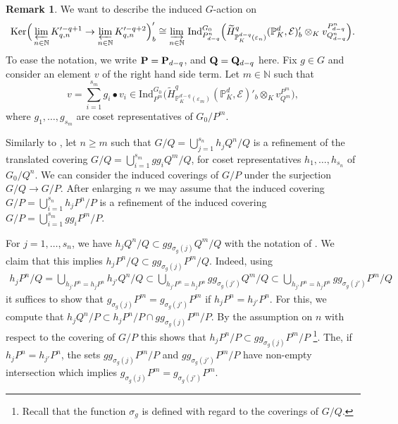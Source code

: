 \documentclass[a4paper, reqno, 10pt]{amsart}
\theoremstyle{definition}
\newtheorem{remark}[theorem]{Remark}
\numberwithin{equation}{section}
\newcommand{\Ind}{{\mathrm{Ind}}}
\newcommand{\Ker}{{\mathrm{Ker}}}
\newcommand{\ra}{\rightarrow}
\newcommand{\BN}{{\mathbb {N}}}
\newcommand{\BP}{{\mathbb {P}}}
\newcommand{\CE}{{\mathcal {E}}}
\newcommand{\bP}{{\mathrm{\bf P}}}
\newcommand{\bQ}{{\mathrm{\bf Q}}}
\begin{document}
\begin{remark}\label{Rmk 3 - G-action on inductive limit of inductions}
	We want to describe the induced $G$-action on 
	\begin{equation*}
		\Ker \Big( \varprojlim_{n\in \BN} K'^{ -q+1}_{q,n} \ra \varprojlim_{n\in \BN} K'^{-q+2}_{q,n} \Big)'_b 
		\cong \varinjlim_{n\in\BN}\, \Ind^{G_0}_{P^n_{d-q}} \Big( \widetilde{H}^{q}_{\BP_K^{d-q}(\varepsilon_n)} (\BP_K^d, \CE)'_b \otimes_K v^{P^n_{d-q}}_{Q^n_{d-q}} \Big) .
	\end{equation*}
	To ease the notation, we write $\bP= \bP_{d-q}$, and $\bQ = \bQ_{d-q}$ here.
	Fix $g\in G$ and consider an element $v$ of the right hand side term. 
	Let $m \in \BN$ such that
	\begin{equation*}
		v = \sum_{i=1}^{s_m} g_i \bullet v_i \in \Ind^{G_0}_{P^m} \Big( \widetilde{H}^{q}_{\BP_K^{d-q}(\varepsilon_m)} (\BP_K^d, \CE)'_b \otimes_K v^{P^m}_{Q^m} \Big) ,
	\end{equation*}
	where $g_1,\ldots,g_{s_m}$ are coset representatives of $G_0/P^m$.
	
	
	Similarly to , let $n\geq m$ such that $G/Q = \bigcup_{j=1}^{s_n} h_j Q^n/ Q$ is a refinement of the translated covering $G/Q = \bigcup_{i=1}^{s_m} g g_i Q^m/Q$, for coset representatives $h_1,\ldots, h_{s_n}$ of $G_0/Q^n$.
	We can consider the induced coverings of $G/P$ under the surjection $G/Q \ra G/P$.
	After enlarging $n$ we may assume that the induced covering $G/P = \bigcup_{i=1}^{s_n} h_j P^n/P$ is a refinement of the induced covering $G/P = \bigcup_{i=1}^{s_m} g g_i P^m/P$.
	
	
	For $j=1,\ldots,s_n$, we have $h_j Q^n/Q \subset g g_{\sigma_g(j)} Q^m/Q$ with the notation of .
	We claim that this implies $h_j P^n/Q \subset g g_{\sigma_g(j)} P^m/Q$.
	Indeed, using
	\begin{align*}
		h_j P^n/Q = \bigcup_{h_{j'} P^n = h_j P^n} h_{j'} Q^n/Q
		\subset \bigcup_{h_{j'} P^n = h_j P^n} g g_{\sigma_g(j')} Q^m/Q
		\subset \bigcup_{h_{j'} P^n = h_j P^n} g g_{\sigma_g(j')} P^m/Q
	\end{align*}	
	it suffices to show that $g_{\sigma_g(j)} P^m = g_{\sigma_g(j')} P^m$ if $h_j P^n = h_{j'} P^n$.
	For this, we compute that $h_j Q^n/P \subset h_j P^n/P \cap g g_{\sigma_g(j)} P^m/P$.
	By the assumption on $n$ with respect to the covering of $G/P$ this shows that $h_j P^n/P \subset g g_{\sigma_g(j)} P^m/P$ \footnote{Recall that the function $\sigma_g$ is defined with regard to the coverings of $G/Q$.}.
	The, if $h_j P^n = h_{j'} P^n$, the sets $ g g_{\sigma_g(j)} P^m/P $ and $g g_{\sigma_g(j')} P^m/P $ have non-empty intersection which implies $g_{\sigma_g(j)} P^m = g_{\sigma_g(j')} P^m$.
	

\end{remark}
\end{document}
